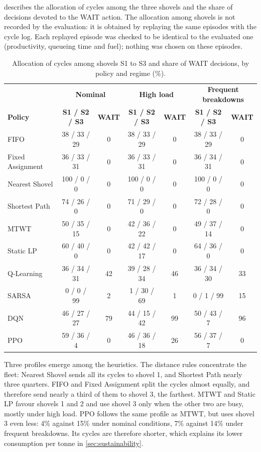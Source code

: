 \documentclass[11pt,a4paper]{article}
\newif\ifrevmarks
\newcommand{\revtag}[1]{\ifrevmarks\textsuperscript{\textcolor{red!70!black}{\scriptsize[#1]}}\fi}
\newenvironment{revbloc}[1]{\par\ifrevmarks\color{revcolor}\noindent\revtag{#1}\ \fi}{\par}
\newif\ifcorrmarks
\newcommand{\corr}[1]{\ifcorrmarks\textcolor{corrcolor}{#1}\else#1\fi}
\begin{document}
\begin{revbloc}{T31}
 describes the allocation of cycles among the three shovels and the share of decisions devoted to the WAIT action. The allocation among shovels is not recorded by the evaluation: it is obtained by replaying the same episodes with the cycle log. Each replayed episode was checked to be identical to the evaluated one (productivity, queueing time and fuel); nothing was chosen on these episodes.

\begin{table}[H]
\centering
\caption{Allocation of cycles among shovels S1 to S3 and share of WAIT decisions, by policy and regime (\%).}
\label{tab:behaviour}
\footnotesize
\setlength{\tabcolsep}{4pt}
\begin{tabular}{lcc|cc|cc}
\toprule
 & \multicolumn{2}{c|}{\textbf{Nominal}} & \multicolumn{2}{c|}{\textbf{High load}} & \multicolumn{2}{c}{\textbf{Frequent breakdowns}} \\
\textbf{Policy} & \textbf{S1 / S2 / S3} & \textbf{WAIT} & \textbf{S1 / S2 / S3} & \textbf{WAIT} & \textbf{S1 / S2 / S3} & \textbf{WAIT} \\
\midrule
FIFO                 & 38 / 33 / 29 & 0 & 38 / 33 / 29 & 0 & 38 / 33 / 29 & 0 \\
Fixed Assignment     & 36 / 33 / 31 & 0 & 36 / 33 / 31 & 0 & 36 / 34 / 31 & 0 \\
Nearest Shovel       & 100 / 0 / 0 & 0 & 100 / 0 / 0 & 0 & 100 / 0 / 0 & 0 \\
Shortest Path        & 74 / 26 / 0 & 0 & 71 / 29 / 0 & 0 & 72 / 28 / 0 & 0 \\
MTWT                 & 50 / 35 / 15 & 0 & 42 / 36 / 22 & 0 & 49 / 37 / 14 & 0 \\
\corr{Static LP}                   & 60 / 40 / 0 & 0 & 42 / 42 / 17 & 0 & 64 / 36 / 0 & 0 \\
\midrule
Q-Learning           & 36 / 34 / 31 & 42 & 39 / 28 / 34 & 46 & 36 / 34 / 30 & 33 \\
SARSA                & 0 / 0 / 99 & 2 & 1 / 30 / 69 & 1 & 0 / 1 / 99 & 15 \\
DQN                  & 46 / 27 / 27 & 79 & 44 / 15 / 42 & 99 & 50 / 43 / 7 & 96 \\
PPO                  & 59 / 36 / 4 & 0 & 46 / 36 / 18 & 26 & 56 / 37 / 7 & 0 \\
\bottomrule
\end{tabular}
\end{table}

Three profiles emerge among the heuristics. The distance rules concentrate the fleet: Nearest Shovel sends all its cycles to shovel 1, and Shortest Path \corr{nearly three quarters}. FIFO and Fixed Assignment split the cycles almost equally, and therefore send nearly a third of them to shovel 3, the farthest. MTWT and \corr{Static LP} favour shovels 1 and 2 and use shovel 3 only when the other two are busy, mostly under high load. PPO follows the same profile as MTWT, but uses shovel 3 even less: 4\% against 15\% under nominal conditions, 7\% against 14\% under frequent breakdowns. Its cycles are therefore shorter, which explains its lower consumption per tonne in \cref{sec:sustainability}.


\end{revbloc}
\end{document}
